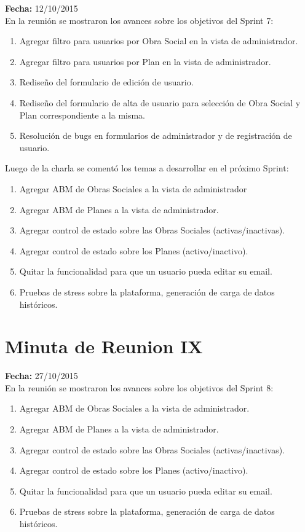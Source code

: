 \documentclass[runningheads,a4paper,spanish]{llncs}
\begin{document}
\textbf{Fecha: }12/10/2015\\

En la reunión se mostraron los avances sobre los objetivos del Sprint 7:
\begin{enumerate}
\item Agregar filtro para usuarios por Obra Social en la vista de administrador.
\item Agregar filtro para usuarios por Plan en la vista de administrador.
\item Rediseño del formulario de edición de usuario.
\item Rediseño del formulario de alta de usuario para selección de Obra Social y Plan correspondiente a la misma.
\item Resolución de bugs en formularios de administrador y de registración de usuario.
\end{enumerate}

\begin{flushleft}
Luego de la charla se comentó los temas a desarrollar en el próximo Sprint:
\end{flushleft}

\begin{enumerate}
	\item Agregar ABM de Obras Sociales a la vista de administrador
	\item Agregar ABM de Planes a la vista de administrador.
	\item Agregar control de estado sobre las Obras Sociales (activas/inactivas).
	\item Agregar control de estado sobre los Planes (activo/inactivo).
	\item Quitar la funcionalidad para que un usuario pueda editar su email.
	\item Pruebas de stress sobre la plataforma, generación de carga de datos históricos.
\end{enumerate}

\section{Minuta de Reunion IX}

\textbf{Fecha: }27/10/2015\\

En la reunión se mostraron los avances sobre los objetivos del Sprint 8:
\begin{enumerate}
\item Agregar ABM de Obras Sociales a la vista de administrador.
\item Agregar ABM de Planes a la vista de administrador.
\item Agregar control de estado sobre las Obras Sociales (activas/inactivas).
\item Agregar control de estado sobre los Planes (activo/inactivo).
\item Quitar la funcionalidad para que un usuario pueda editar su email.
\item Pruebas de stress sobre la plataforma, generación de carga de datos históricos.
\end{enumerate}
\end{document}
